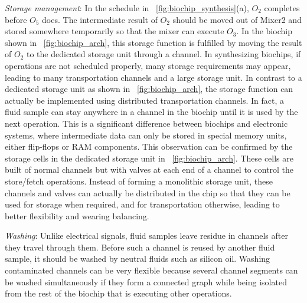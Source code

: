\textit{Storage management}: In the schedule in
\figname~\ref{fig:biochip_synthesis}(a), $O_2$ completes before $O_5$ does. The
intermediate result of $O_2$ should be moved out of Mixer2 and stored
somewhere temporarily so that the mixer
can execute $O_3$. 
In the biochip shown in \figname~\ref{fig:biochip_arch}, 
this storage function is fulfilled by moving the result of $O_2$
to the dedicated storage unit through a channel. 
In synthesizing biochips, if operations are not
scheduled properly, many storage requirements may appear, leading to
many transportation channels and a large storage unit. 
In contrast to a dedicated storage unit as shown in \figname~\ref{fig:biochip_arch},
the storage function can actually be implemented using
distributed transportation channels. %
In fact, a fluid sample can stay anywhere in a channel in the biochip until it is
used by the next operation. 
This is a significant difference between biochips and electronic systems, 
where intermediate data can only be stored in special memory units, either
flip-flops or RAM components. This observation can be confirmed by
the storage cells in the dedicated storage unit in
\figname~\ref{fig:biochip_arch}. These cells are built of normal channels
but with valves at each end of a channel to control the store/fetch
operations.  Instead of forming a monolithic storage unit, 
these channels and valves %
can actually be distributed in the chip so that
they can be used for storage when required, and for transportation otherwise,
leading to better flexibility and wearing balancing. 

\textit{Washing}: Unlike electrical signals, fluid samples leave residue in
channels after they travel through them. Before such a
channel is reused by another fluid sample, it should be washed by neutral fluids
such as silicon oil. Washing contaminated channels can be very flexible
because several channel segments can be washed simultaneously if they 
form a connected graph while being isolated from the rest of the biochip
that is executing other operations.

